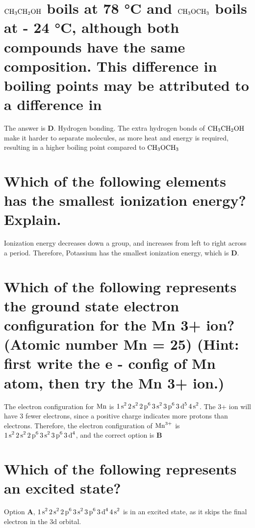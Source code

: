 \documentclass{scrartcl}
\begin{document}
\section{\(\ce{CH3CH2OH}\) boils at 78 °C and \(\ce{CH3OCH3}\) boils at - 24 °C, although both compounds have the same composition. This difference in boiling points may be attributed to a difference in}
\label{sec:org68f6f86}
The answer is \textbf{D}. Hydrogen bonding. The extra hydrogen bonds of \(\ce{CH3CH2OH}\) make it harder to separate molecules, as more heat and energy is required, resulting in a higher boiling point compared to \(\ce{CH3OCH3}\)

\section{Which of the following elements has the smallest ionization energy? Explain.}
\label{sec:org997f6d0}
Ionization energy decreases down a group, and increases from left to right
across a period. Therefore, Potassium has the smallest ionization energy, which is \textbf{D}.

\section{Which of the following represents the ground state electron configuration for the Mn 3+ ion? (Atomic number Mn = 25) (Hint: first write the e - config of Mn atom, then try the Mn 3+ ion.)}
\label{sec:orgcad13c2}
The electron configuration for \(\ce{Mn}\) is \(\ce{1s^2 2s^2 2p^6 3s^2 3p^6 3d^5 4s^2}\). The 3+ ion will have 3 fewer electrons, since a positive charge indicates more protons than electrons. Therefore, the electron configuration of \(\ce{Mn^{3+}}\) is \(\ce{1s^2 2s^2 2p^6 3s^2 3p^6 3d^4}\), and the correct option is \textbf{B}

\section{Which of the following represents an excited state?}
\label{sec:orge569a27}
Option \textbf{A}, \(\ce{1s^2 2s^2 2p^6 3s^2 3p^6 3d^4 4s^2}\) is in an excited state, as it skips the final electron in the 3d orbital.
\end{document}
